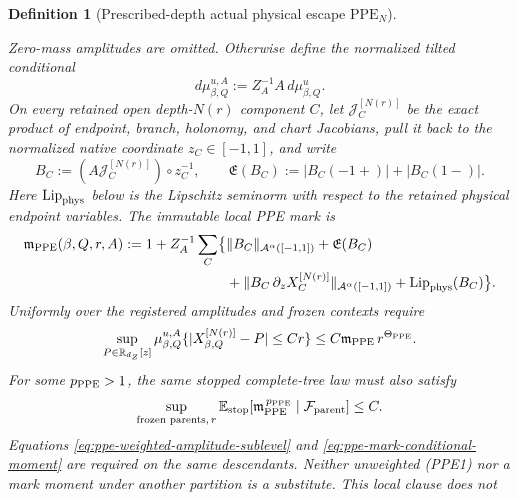 \documentclass[11pt]{article}
\newtheorem{definition}[theorem]{Definition}
\begin{document}
\begin{definition}[Prescribed-depth actual physical escape
$\mathrm{PPE}_{N}$]
\begin{enumerate}[label=\textup{(PPE\arabic*)}]
\[      \]
      Zero-mass amplitudes are omitted.  Otherwise define the normalized
      tilted conditional
      \begin{equation}
      \label{eq:ppe-amplitude-tilt}
       d\mu_{\beta,Q}^{u,A}:=Z_A^{-1}A\,d\mu^u_{\beta,Q}.
      \end{equation}
      On every retained open depth-$N(r)$ component $C$, let
      $\mathcal J_C^{[N(r)]}$ be the exact product of endpoint, branch,
      holonomy, and chart Jacobians, pull it back to the normalized native
      coordinate $z_C\in[-1,1]$, and write
      \[
       B_C:=(A\mathcal J_C^{[N(r)]})\circ z_C^{-1},
       \qquad
       \mathfrak E(B_C):=|B_C(-1+)|+|B_C(1-)|.
      \]
      Here $\operatorname{Lip}_{\rm phys}$ below is the Lipschitz seminorm
      with respect to the retained physical endpoint variables.  The
      immutable local PPE mark is
      \begin{equation}
      \label{eq:exact-local-ppe-mark}
      \begin{aligned}
       \mathfrak m_{\rm PPE}(\beta,Q,r,A)
       :=1+Z_A^{-1}\sum_C\bigl\{&
        \|B_C\|_{\mathcal A^\alpha([-1,1])}
        +\mathfrak E(B_C)\\
        &+\|B_C\,\partial_zX_C^{[N(r)]}\|_{\mathcal A^\alpha([-1,1])}
        +\operatorname{Lip}_{\rm phys}(B_C)\bigr\}.
      \end{aligned}
      \end{equation}
      Uniformly over the registered amplitudes and frozen contexts require
      \begin{equation}
      \label{eq:ppe-weighted-amplitude-sublevel}
       \sup_{P\in\mathbb R_{d_Z}[z]}
       \mu_{\beta,Q}^{u,A}
       \{|X_{\beta,Q}^{[N(r)]}-P|\le Cr\}
       \le C\mathfrak m_{\rm PPE}\,r^{\Theta_{\rm PPE}}.
      \end{equation}
      For some $p_{\rm PPE}>1$, the same stopped complete-tree law must also
      satisfy
      \begin{equation}
      \label{eq:ppe-mark-conditional-moment}
       \sup_{\textup{frozen parents},\,r}
       \mathbb E_{\rm stop}\!\left[
        \mathfrak m_{\rm PPE}^{\,p_{\rm PPE}}
        \mid\mathcal F_{\rm parent}\right]\le C.
      \end{equation}
      Equations \eqref{eq:ppe-weighted-amplitude-sublevel} and
      \eqref{eq:ppe-mark-conditional-moment} are required on the same
      descendants.  Neither unweighted \textup{(PPE1)} nor a mark moment
      under another partition is a substitute.  This local clause does not

\end{enumerate}
\end{definition}
\end{document}
